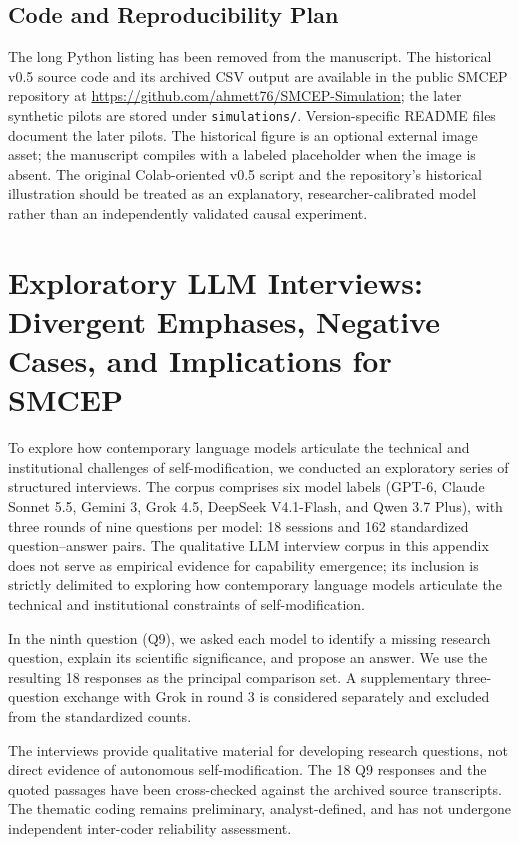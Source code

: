 \documentclass[11pt,a4paper]{article}
\begin{document}
\FloatBarrier

\subsection{Code and Reproducibility Plan}
The long Python listing has been removed from the manuscript. The historical v0.5 source code and its archived CSV output are available in the public SMCEP repository at \url{https://github.com/ahmett76/SMCEP-Simulation}; the later synthetic pilots are stored under \texttt{simulations/}. Version-specific README files document the later pilots. The historical figure is an optional external image asset; the manuscript compiles with a labeled placeholder when the image is absent. The original Colab-oriented v0.5 script and the repository's historical illustration should be treated as an explanatory, researcher-calibrated model rather than an independently validated causal experiment.


\section{Exploratory LLM Interviews: Divergent Emphases, Negative Cases, and Implications for SMCEP}\label{exploratory-llm-interviews-divergent-emphases-negative-cases-and-implications-for-smcep}

To explore how contemporary language models articulate the technical and institutional challenges of self-modification, we conducted an exploratory series of structured interviews. The corpus comprises six model labels (GPT-6, Claude Sonnet 5.5, Gemini 3, Grok 4.5, DeepSeek V4.1-Flash, and Qwen 3.7 Plus),
with three rounds of nine questions per model: 18 sessions and 162 standardized question--answer pairs.
The qualitative LLM interview corpus in this appendix does not serve as empirical evidence for capability emergence; its inclusion is strictly delimited to exploring how contemporary language models articulate the technical and institutional constraints of self-modification.

In the ninth question (Q9), we asked each model to identify a missing research question, explain
its scientific significance, and propose an answer. We use the resulting 18 responses as the principal
comparison set. A supplementary three-question exchange with Grok in round 3 is considered separately and excluded from the standardized counts.

The interviews provide qualitative material for developing research questions, not direct evidence
of autonomous self-modification. The 18 Q9 responses and the quoted passages have been
cross-checked against the archived source transcripts. The thematic coding remains preliminary,
analyst-defined, and has not undergone independent inter-coder reliability assessment.
\end{document}
